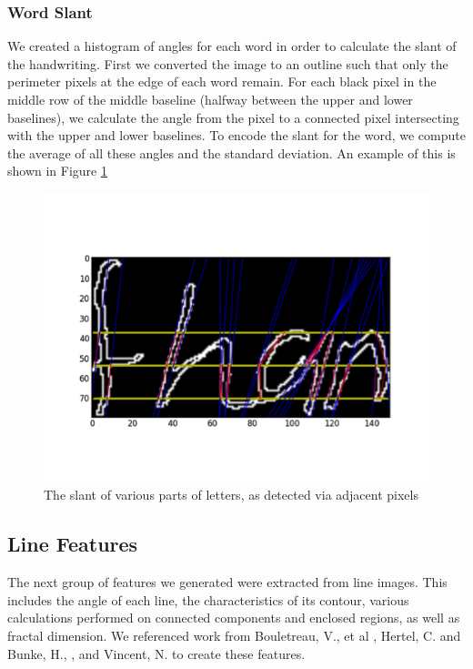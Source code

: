 \documentclass[paper=a4, fontsize=11pt]{scrartcl} %
\numberwithin{equation}{section} %
\numberwithin{figure}{section} %
\numberwithin{table}{section} %
\begin{document}
\subsubsection{Word Slant}
We created a histogram of angles for each word in order to calculate
the slant of the handwriting. First we converted the image to an outline such
that only the perimeter pixels at the edge of each word remain. For
each black pixel in the middle row of the middle baseline (halfway between the
upper and lower baselines), we calculate the angle from the pixel to
a connected pixel intersecting with the upper and lower baselines. To
encode the slant for the word, we compute the average of all these angles and the standard deviation. An example of this is shown in Figure
\ref{fig:wordslant}

\begin{figure}
  \centering \includegraphics{wordslant.png}
  \caption{The slant of various parts of letters, as detected via
    adjacent pixels}
  \label{fig:wordslant}
\end{figure}


\subsection{Line Features}
The next group of features we generated were extracted from line
images. This includes the angle of each line, the characteristics of
its contour, various calculations performed on connected components
and enclosed regions, as well as fractal dimension. We referenced work
from Bouletreau, V., et al \cite{SyntheticParameters}, Hertel, C. and
Bunke, H., \cite{NovelFeatures}, and Vincent,
N. \cite{FractalDimensions} to create these features.
\end{document}
